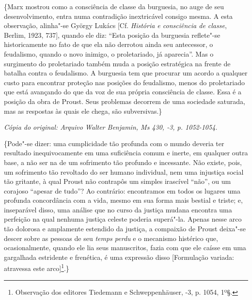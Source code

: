 \{Marx mostrou como a consciência de classe da burguesia, no auge de seu
desenvolvimento, entra numa contradição inextricável consigo mesma. A
esta observação, alinha"-se György Lukács {[}Cf. \emph{História e
consciência de classe}, Berlim, 1923, 737{]}, quando ele diz: ``Esta %
posição da burguesia reflete"-se historicamente no fato de que ela não
derrotou ainda seu antecessor, o feudalismo, quando o novo inimigo, o
proletariado, já aparecia''. Mas o surgimento do proletariado também
muda a posição estratégica na frente de batalha contra o feudalismo. A
burguesia tem que procurar um acordo a qualquer custo para encontrar
proteção nas posições do feudalismo, menos do proletariado que está
avançando do que da voz de sua própria consciência de classe. Essa é a
posição da obra de Proust. Seus problemas decorrem de uma sociedade
saturada, mas as respostas às quais ele chega, são subversivas.\}


\begin{flushright}
\emph{\small{Cópia do original: Arquivo Walter Benjamin, Ms 430, -3, p. 1052-1054.}}
\end{flushright}

\{Pode"-se dizer: uma cumplicidade tão profunda com o mundo deveria ter
resultado inequivocamente em uma suficiência comum e inerte, em qualquer
outra base, a não ser na de um sofrimento tão profundo e
incessante. Não existe, pois, um sofrimento tão revoltado do ser
humano individual, nem uma injustiça social tão gritante, à qual Proust
não contrapôs um simples irascível ``não'', ou um corajoso ``apesar de %
tudo''? Ao contrário: encontramos em todos os lugares uma profunda
concordância com a vida, mesmo em sua forma mais bestial e triste; e,
inseparável disso, uma análise que no curso da justiça
mudana encontra uma perfeição na qual nenhuma justiça celeste poderia
superá"-la. Apenas nesse arco tão dolorosa e amplamente estendido da
justiça, a compaixão de Proust deixa"-se descer sobre as pessoas de seu
\emph{temps perdu} e o mecanismo histérico que, ocasionalmente, quando
ele lia seus manuscritos, fazia com que ele caísse em uma gargalhada
estridente e frenética, é uma expressão disso {[}Formulação variada:
atravessa este arco{]}\footnote{Observação dos editores Tiedemann e
  Schweppenhäuser, -3, p. 1054, 1º§. \versal{[N. T.]}}.\}

